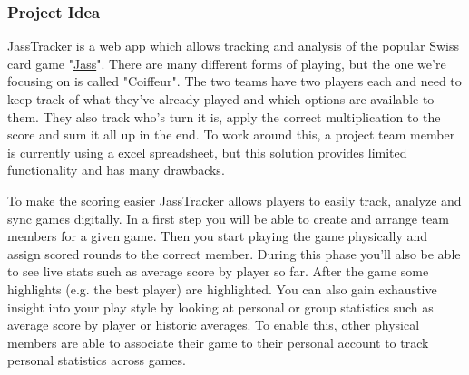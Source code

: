 


\subsubsection*{Project Idea}

JassTracker is a web app which allows tracking and analysis of the popular Swiss card game "\href{https://de.wikipedia.org/wiki/Jass}{Jass}".
There are many different forms of playing, but the one we're focusing on is called "Coiffeur".
The two teams have two players each and need to keep track of what they've already played and which options are available to them.
They also track who's turn it is, apply the correct multiplication to the score and sum it all up in the end.
To work around this, a project team member is currently using a excel spreadsheet, but this solution provides limited functionality and has many drawbacks.

To make the scoring easier JassTracker allows players to easily track, analyze and sync games digitally.
In a first step you will be able to create and arrange team members for a given game.
Then you start playing the game physically and assign scored rounds to the correct member.
During this phase you'll also be able to see live stats such as average score by player so far.
After the game some highlights (e.g. the best player) are highlighted.
You can also gain exhaustive insight into your play style by looking at personal or group statistics such as average score by player or historic averages.
To enable this, other physical members are able to associate their game to their personal account to track personal statistics across games.


